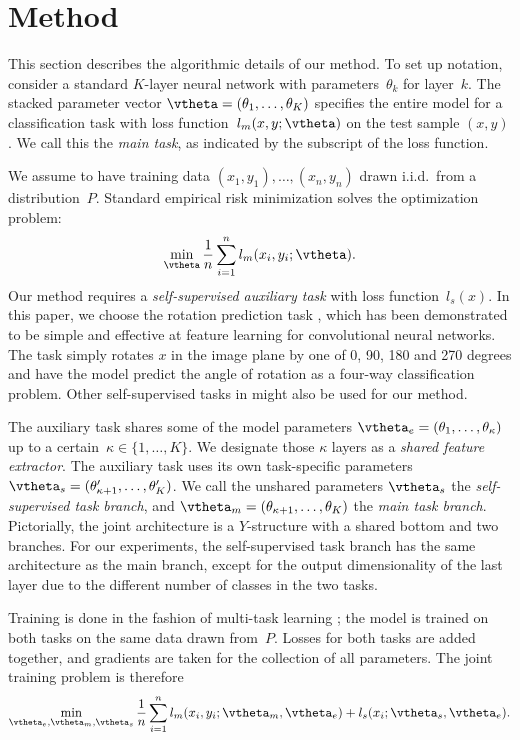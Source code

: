 \section{Method}
\label{method}
This section describes the algorithmic details of our method.
To set up notation, consider a standard $K$-layer neural network with parameters~$\theta_k$ for layer~$k$. The stacked parameter vector $\vtheta=(\theta_1,\dots,\theta_K)$ specifies the entire model for a classification task with loss function~$l_m(x, y; \vtheta)$ on the test sample $(x,y)$. We call this the \emph{main task}, as indicated by the subscript of the loss function. 

We assume to have training data $(x_1,y_1),\dots,(x_n, y_n)$ drawn i.i.d.~from a distribution~$P$. Standard empirical risk minimization solves the optimization problem:
\begin{equation} \label{optimize}
\min_\vtheta \frac{1}{n}\sum_{i=1}^{n} l_m(x_i, y_i; \vtheta).
\end{equation}
Our method requires a \emph{self-supervised auxiliary task} with loss function~$l_s(x)$. 
In this paper, we choose the rotation prediction task \citep{gidaris2018unsupervised}, which has been demonstrated to be simple and effective at feature learning for convolutional neural networks.
The task simply rotates $x$ in the image plane by one of 0, 90, 180 and 270 degrees and have the model predict the angle of rotation as a four-way classification problem. 
Other self-supervised tasks in  might also be used for our method.

The auxiliary task shares some of the model parameters
$\vtheta_e=(\theta_1,\dots,\theta_\kappa)$ up to a
certain~$\kappa\in\{1,\dots,K\}.$
We designate those $\kappa$ layers as a
\emph{shared feature extractor}. 
The auxiliary task uses its own task-specific parameters 
$\vtheta_s = (\theta'_{\kappa+1},\dots, \theta'_{K})$. 
We call the unshared parameters $\vtheta_s$ the \emph{self-supervised task branch}, and $\vtheta_m=(\theta_{\kappa+1},\dots,\theta_K)$ the
\emph{main task branch}.
Pictorially, the joint architecture is a $Y$-structure with a shared bottom and two branches.
For our experiments, the self-supervised task branch has the same architecture as the main branch, except for the output dimensionality of the last layer due to the different number of classes in the two tasks.

Training is done in the fashion of multi-task learning \citep{caruana1997multitask}; the model is trained on both tasks on the same data drawn from~$P$. 
Losses for both tasks are added together, and gradients are taken for the collection of all parameters. The joint training problem is therefore
\begin{equation}
\label{optimize_train}
\min_{\vtheta_e,\vtheta_m,\vtheta_s}
\frac{1}{n}\sum_{i=1}^{n} 
l_m(x_i, y_i; \vtheta_m, \vtheta_e)
+ l_s(x_i; \vtheta_s, \vtheta_e).
\end{equation}

